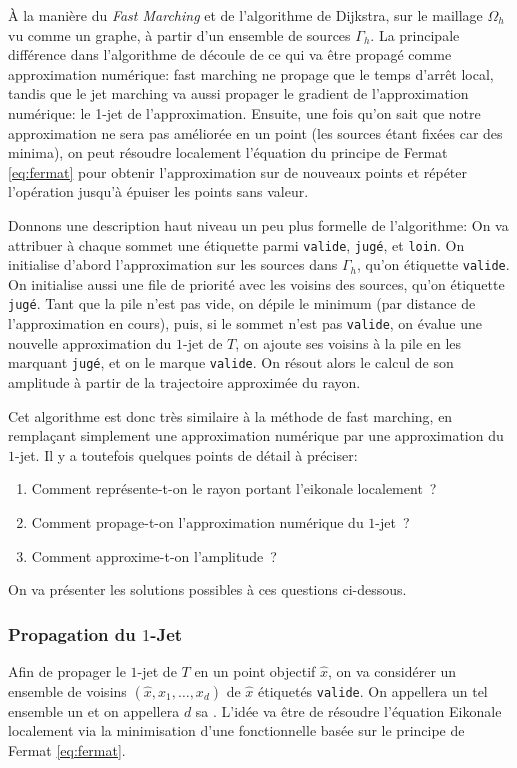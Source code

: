 \documentclass[math, info]{mpb-cours}
\begin{document}
\smallskip

À la manière du \textit{Fast Marching} et de l'algorithme de Dijkstra, sur le maillage $\Omega_{h}$ vu comme
un graphe, à partir d'un ensemble de sources $\Gamma_{h}$.
La principale différence dans l'algorithme de  découle de ce qui va être propagé
comme approximation numérique: fast marching ne propage que le temps d'arrêt local, tandis que le jet
marching va aussi propager le gradient de l'approximation numérique: le 1-jet de l'approximation.
Ensuite, une fois qu'on sait que notre approximation ne sera pas améliorée en un point (les sources étant
fixées car des minima), on peut résoudre localement l'équation du principe de
Fermat \eqref{eq:fermat} pour obtenir l'approximation sur de nouveaux points et répéter l'opération jusqu'à
épuiser les points sans valeur.

\smallskip

Donnons une description haut niveau un peu plus formelle de l'algorithme:
On va attribuer à chaque sommet une étiquette parmi \texttt{valide}, \texttt{jugé}, et
\texttt{loin}.
On initialise d'abord l'approximation sur les sources dans $\Gamma_{h}$, qu'on étiquette \texttt{valide}.
On initialise aussi une file de priorité avec les voisins des sources, qu'on étiquette \texttt{jugé}.
Tant que la pile n'est pas vide, on dépile le minimum (par distance de l'approximation en cours), puis,
si le sommet n'est pas \texttt{valide}, on évalue une nouvelle approximation du $1$-jet de $T$,
on ajoute ses voisins à la pile en les marquant \texttt{jugé}, et on le marque \texttt{valide}.
On résout alors le calcul de son amplitude à partir de la trajectoire approximée du rayon.

\smallskip

Cet algorithme est donc très similaire à la méthode de fast marching, en remplaçant simplement une
approximation numérique par une approximation du $1$-jet.
Il y a toutefois quelques points de détail à préciser:
\begin{enumerate}
	\item Comment représente-t-on le rayon portant l'eikonale localement~?
	\item Comment propage-t-on l'approximation numérique du $1$-jet~?
	\item Comment approxime-t-on l'amplitude~?
\end{enumerate}
On va présenter les solutions possibles à ces questions ci-dessous.

\subsubsection{Propagation du \texorpdfstring{$1$-Jet}{1-Jet}}
Afin de propager le $1$-jet de $T$ en un point objectif $\hat{x}$, on va considérer un ensemble de
voisins $(\hat{x}, x_{1}, \ldots, x_{d})$ de $\hat{x}$ étiquetés \texttt{valide}.
On appellera un tel ensemble un  et on appellera $d$ sa .
L'idée va être de résoudre l'équation Eikonale localement via la minimisation d'une fonctionnelle basée
sur le principe de Fermat \eqref{eq:fermat}.
\end{document}
